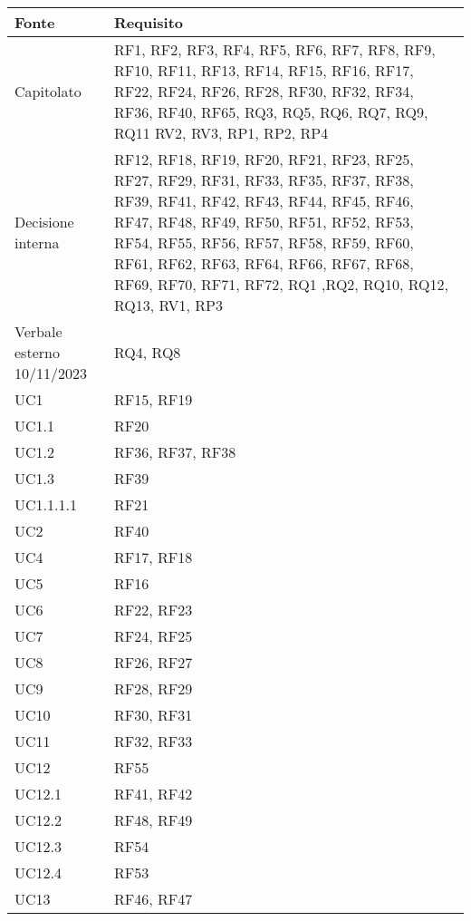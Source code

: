 \begin{center}
    \begin{longtable}{|C{5cm}|C{5cm}|}
        \hline
        \textbf{Fonte} & \textbf{Requisito} \\
        \hline
        Capitolato & RF1, RF2, RF3, RF4, RF5, RF6, RF7, RF8, RF9, RF10, RF11, RF13, RF14, RF15, RF16, RF17, RF22, RF24, RF26, RF28, RF30, RF32, RF34, RF36, RF40, RF65, RQ3, RQ5, RQ6, RQ7, RQ9, RQ11 RV2, RV3, RP1, RP2, RP4  \\
        \hline
        Decisione interna & RF12, RF18, RF19, RF20, RF21, RF23, RF25, RF27, RF29, RF31, RF33, RF35, RF37, RF38, RF39, RF41, RF42, RF43, RF44, RF45, RF46, RF47, RF48, RF49, RF50, RF51, RF52, RF53, RF54, RF55, RF56, RF57, RF58, RF59, RF60, RF61, RF62, RF63, RF64, RF66, RF67, RF68, RF69, RF70, RF71, RF72, RQ1 ,RQ2, RQ10, RQ12, RQ13, RV1, RP3 \\
        \hline
        Verbale esterno 10/11/2023 & RQ4, RQ8 \\
        \hline
        UC1 & RF15, RF19 \\
        \hline
        UC1.1 & RF20 \\
        \hline
        UC1.2 & RF36, RF37, RF38 \\
        \hline
        UC1.3 & RF39 \\
        \hline
        UC1.1.1.1 & RF21 \\
        \hline
        UC2 & RF40 \\
        \hline
        UC4 & RF17, RF18 \\
        \hline
        UC5 & RF16 \\
        \hline
        UC6 & RF22, RF23 \\
        \hline
        UC7 & RF24, RF25 \\
        \hline
        UC8 & RF26, RF27 \\
        \hline
        UC9 & RF28, RF29 \\
        \hline
        UC10 & RF30, RF31 \\
        \hline
        UC11 & RF32, RF33 \\
        \hline
        UC12 & RF55 \\
        \hline
        UC12.1 & RF41, RF42 \\
        \hline
        UC12.2 & RF48, RF49 \\
        \hline
        UC12.3 & RF54 \\
        \hline
        UC12.4 & RF53 \\
        \hline
        UC13 & RF46, RF47 \\

\end{longtable}
\end{center}
